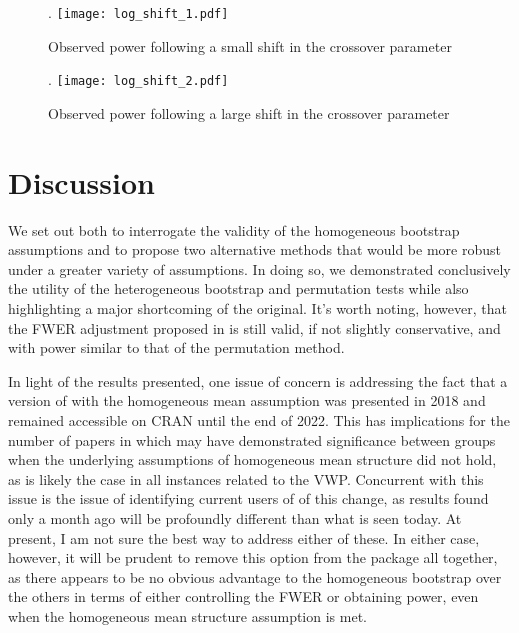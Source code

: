 \begin{figure}[t]
\centering.
\texttt{[image: log\_shift\_1.pdf]}
\caption{ Observed power following a small shift in the crossover parameter}
\label{fig:log_shift_1}
\end{figure}

\begin{figure}[t]
\centering.
\texttt{[image: log\_shift\_2.pdf]}
\caption{Observed power following a large shift in the crossover parameter}
\label{fig:log_shift_2}
\end{figure}

\section{Discussion}


We set out both to interrogate the validity of the homogeneous bootstrap assumptions and to propose two alternative methods that would be more robust under a greater variety of assumptions. In doing so, we demonstrated conclusively the utility of the heterogeneous bootstrap and permutation tests while also highlighting a major shortcoming of the original. It's worth noting, however, that the FWER adjustment proposed in \cite{oleson2017detecting} is still valid, if not slightly conservative, and with power similar to that of the permutation method. 

In light of the results presented, one issue of concern is addressing the fact that a version of  with the homogeneous mean assumption was presented in 2018 and remained accessible on CRAN until the end of 2022. This has implications for the number of papers in which  may have demonstrated significance between groups when the underlying assumptions of homogeneous mean structure did not hold, as is likely the case in all instances related to the VWP. Concurrent with this issue is the issue of identifying current users of  of this change, as results found only a month ago will be profoundly different than what is seen today. At present, I am not sure the best way to address either of these. In either case, however, it will be prudent to remove this option from the  package all together, as there appears to be no obvious advantage to the homogeneous bootstrap over the others in terms of either controlling the FWER or obtaining power, even when the homogeneous mean structure assumption is met.

